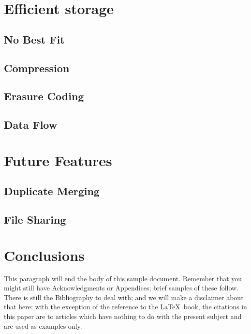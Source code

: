 \documentclass{acm_proc_article-sp}
\begin{document}
\section{Efficient storage}

\subsection{No Best Fit}

\subsection{Compression}

\subsection{Erasure Coding}

\subsection{Data Flow}

\section{Future Features}

\subsection{Duplicate Merging}

\subsection{File Sharing}



\section{Conclusions}
This paragraph will end the body of this sample document.
Remember that you might still have Acknowledgments or
Appendices; brief samples of these
follow.  There is still the Bibliography to deal with; and
we will make a disclaimer about that here: with the exception
of the reference to the \LaTeX\ book, the citations in
this paper are to articles which have nothing to
do with the present subject and are used as
examples only.
\end{document}
